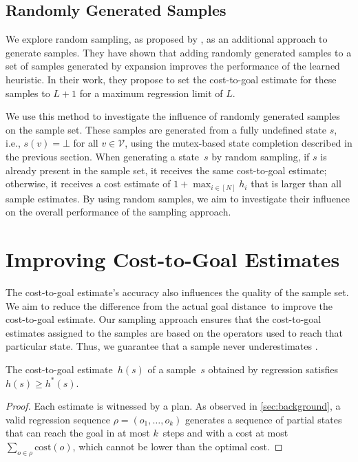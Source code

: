 \subsection{Randomly Generated Samples}
\label{sec:random-samples}

We explore random sampling, as proposed by \citet{otoole2022sampling}, as an additional approach to generate samples. They have shown that adding randomly generated samples to a set of samples generated by expansion improves the performance of the learned heuristic. In their work, they propose to set the cost-to-goal estimate for these samples to $L+1$ for a maximum regression limit of $L$.

We use this method to investigate the influence of randomly generated samples on the sample set. These samples are generated from a fully undefined state $s$, i.e., $s(v) = \bot$ for all $v \in \mathcal{V}$, using the mutex-based state completion described in the previous section. When generating a state~$s$ by random sampling, if $s$ is already present in the sample set, it receives the same cost-to-goal estimate; otherwise, it receives a cost estimate of $1+\max_{i\in[N]} h_i$ that is larger than all sample estimates. By using random samples, we aim to investigate their influence on the overall performance of the sampling approach.

\section{Improving Cost-to-Goal Estimates}
\label{sec:cost-to-goal-estimates}

The cost-to-goal estimate's accuracy also influences the quality of the sample set. We aim to reduce the difference from the actual goal distance~\hstar to improve the cost-to-goal estimate. Our sampling approach ensures that the cost-to-goal estimates assigned to the samples are based on the operators used to reach that particular state. Thus, we guarantee that a sample never underestimates \hstar.

\begin{property}
    \label{prop:hvalue}
    The cost-to-goal estimate~$h(s)$ of a sample~$s$ obtained by regression satisfies $h(s)\geq h^*(s)$.
\end{property}
\begin{proof}
    Each estimate is witnessed by a plan. As observed in \cref{sec:background}, a valid regression sequence $\rho=(o_1,\ldots,o_k)$ generates a sequence of partial states that can reach the goal in at most $k$~steps and with a cost at most $\sum_{o\in\rho}\text{cost}(o)$, which cannot be lower than the optimal cost.
\end{proof}

